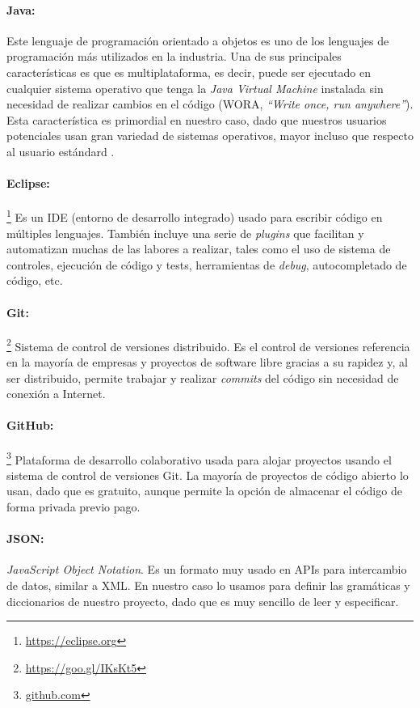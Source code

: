 \paragraph{Java:} Este lenguaje de programación orientado a objetos es uno de los lenguajes de programación más utilizados en la industria. Una de sus principales características es que es multiplataforma, es decir, puede ser ejecutado en cualquier sistema operativo que tenga la \textit{Java Virtual Machine} instalada sin necesidad de realizar cambios en el código (WORA, \textit{``Write once, run anywhere''}). Esta característica es primordial en nuestro caso, dado que nuestros usuarios potenciales usan gran variedad de sistemas operativos, mayor incluso que respecto al usuario estándard	.

 \paragraph{Eclipse:}\footnote{\url{https://eclipse.org}} Es un IDE (entorno de desarrollo integrado) usado para escribir código en múltiples lenguajes. También incluye una serie de \textit{plugins} que facilitan y automatizan muchas de las labores a realizar, tales como el uso de sistema de controles, ejecución de código y tests, herramientas de \textit{debug}, autocompletado de código, etc.

 \paragraph{Git:}\footnote{\url{https://goo.gl/IKsKt5}} Sistema de control de versiones distribuido. Es el control de versiones referencia en la mayoría de empresas y proyectos de software libre gracias a su rapidez y, al ser distribuido, permite trabajar y realizar \textit{commits} del código sin necesidad de conexión a Internet.

 \paragraph{GitHub:}\footnote{\url{github.com}} Plataforma de desarrollo colaborativo usada para alojar proyectos usando el sistema de control de versiones Git. La mayoría de proyectos de código abierto lo usan, dado que es gratuito, aunque permite la opción de almacenar el código de forma privada previo pago.

\paragraph{JSON:} \textit{JavaScript Object Notation}. Es un formato muy usado en APIs para intercambio de datos, similar a XML. En nuestro caso lo usamos para definir las gramáticas y diccionarios de nuestro proyecto, dado que es muy sencillo de leer y especificar.

